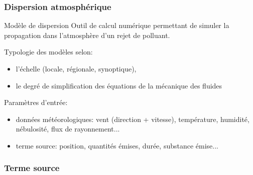\documentclass{beamer}
\begin{document}

\begin{frame}
	\frametitle{Dispersion atmosphérique}
	\begin{block}{Modèle de dispersion}
		Outil de calcul numérique permettant de simuler la propagation dans l'atmosphère d'un rejet de polluant.
	\end{block}
	
	
	Typologie des modèles selon:
	\begin{itemize}
		\item  l'échelle (locale, régionale, synoptique),
		\item le degré de simplification des équations de la mécanique des fluides
	\end{itemize}
	
	Paramètres d'entrée:
	\begin{itemize}
		\item données météorologiques: vent (direction + vitesse), température, humidité, nébulosité, flux de rayonnement...
		\item terme source: position, quantités émises, durée, substance émise...
	\end{itemize}
\end{frame}

\begin{frame}
	\frametitle{Terme source}

\end{frame}
\end{document}
